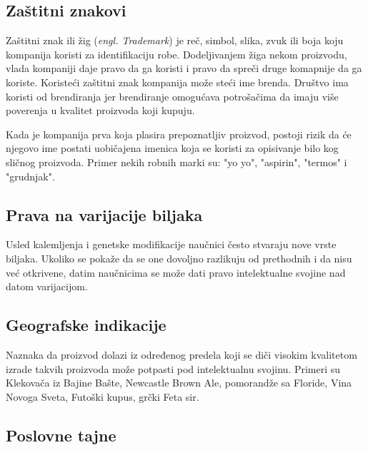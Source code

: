 \documentclass[a4paper]{article}
\begin{document}
\subsection{Zaštitni znakovi}
\label{subsec:trademark}

Zaštitni znak ili žig (\emph{engl. Trademark}) je reč, simbol, slika, zvuk ili boja koju kompanija koristi za identifikaciju robe. Dodeljivanjem žiga nekom proizvodu, vlada kompaniji daje pravo da ga koristi i pravo da spreči druge komapnije da ga koriste. Koristeći zaštitni znak kompanija može steći ime brenda. Društvo ima koristi od brendiranja jer brendiranje omogućava potrošačima da imaju više poverenja u kvalitet proizvoda koji kupuju. 

Kada je kompanija prva koja plasira prepoznatljiv proizvod, postoji rizik da će njegovo ime postati uobičajena imenica koja se koristi za opisivanje bilo kog sličnog proizvoda. Primer nekih robnih marki su: "yo yo", "aspirin", "termos" \space i "grudnjak".

\subsection{Prava na varijacije biljaka}
\label{subsec:granje}

Usled kalemljenja i genetske modifikacije naučnici često stvaraju nove vrste biljaka. Ukoliko se pokaže da se one dovoljno razlikuju od prethodnih i da nisu već otkrivene, datim naučnicima se može dati pravo intelektualne svojine nad datom varijacijom.

\newpage

\subsection{Geografske indikacije}
\label{subsec:geo}

Naznaka da proizvod dolazi iz određenog predela koji se diči visokim kvalitetom izrade takvih proizvoda može potpasti pod intelektualnu svojinu. Primeri su Klekovača iz Bajine Bašte, Newcastle Brown Ale, pomorandže sa Floride, Vina Novoga Sveta, Futoški kupus, grčki Feta sir.

\subsection{Poslovne tajne}
\label{subsec:poslovne}
\end{document}
